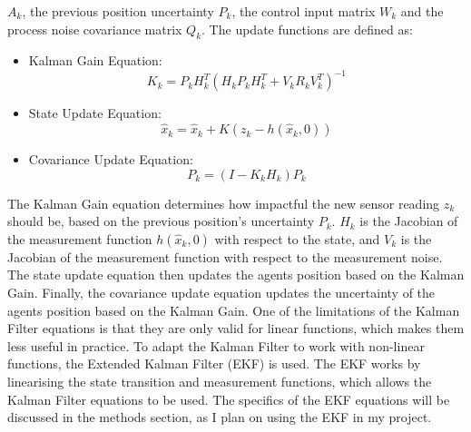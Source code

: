 \documentclass[12pt]{article}
\begin{document}
\(A_{k}\), the previous position uncertainty \(P_{k}\), the control input matrix \(W_{k}\) and the process noise covariance matrix \(Q_{k}\).
The update functions are defined as:
\begin{itemize}
    \item Kalman Gain Equation:
    \begin{equation}
        K_k = P_{k} H_k^T (H_k P_{k} H_k^T + V_k R_k V_k^T)^{-1}
    \end{equation}
    \item State Update Equation:
    \begin{equation}
        \hat{x}_{k} = \hat{x}_{k} + K(z_k - h(\hat{x}_{k}, 0))
    \end{equation}
    \item Covariance Update Equation:
    \begin{equation}
        P_{k} = (I - K_k H_k) P_k
    \end{equation}
\end{itemize}
The Kalman Gain equation determines how impactful the new sensor reading \(z_k\) should be, based on the previous position's
uncertainty \(P_{k}\). \(H_k\) is the Jacobian of the measurement function \(h(\hat{x}_{k}, 0)\) with respect to the state, and \(V_k\) is the Jacobian of the measurement function with respect to the measurement noise.
The state update equation then updates the agents position based on the Kalman Gain.
Finally, the covariance update equation updates the uncertainty of the agents position based on the Kalman Gain.
One of the limitations of the Kalman Filter equations is that they are only valid for linear functions, which makes them less useful in practice.
To adapt the Kalman Filter to work with non-linear functions, the Extended Kalman Filter (EKF) is used.
The EKF works by linearising the state transition and measurement functions, which allows the Kalman Filter equations to be used.
The specifics of the EKF equations will be discussed in the methods section, as I plan on using the EKF in my project.\\
\end{document}
